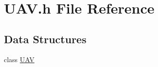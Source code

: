 \hypertarget{a00039}{\section{U\-A\-V.\-h File Reference}
\label{a00039}
}
\subsection*{Data Structures}
\begin{DoxyCompactItemize}
\item 
class \hyperlink{a00013}{U\-A\-V}
\end{DoxyCompactItemize}
